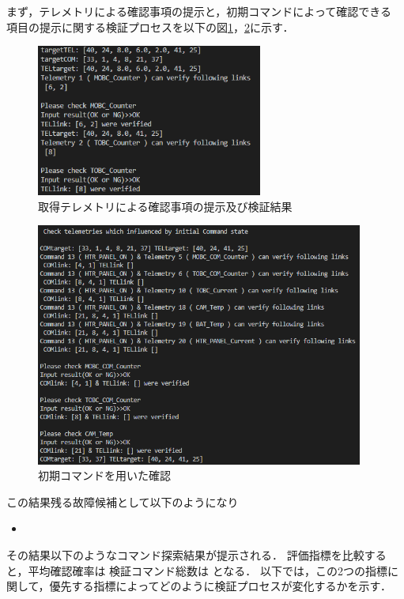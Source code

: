 \documentclass[11pt]{jsreport}
\begin{document}
まず，テレメトリによる確認事項の提示と，初期コマンドによって確認できる
項目の提示に関する検証プロセスを以下の図\ref{fig:fault_mode3_TEL_list}，\ref{fig:fault_mode3_iniCOM}に示す．
\begin{figure}[H]
   \centering
      \includegraphics[height=5.0cm]{figure/COM13_TEL16_17_14start_show_TEL_list.png}
      \caption{取得テレメトリによる確認事項の提示及び検証結果}
      \label{fig:fault_mode3_TEL_list}
\end{figure}
\begin{figure}[H]
   \centering
      \includegraphics[height=8.0cm]{figure/COM13_TEL16_17_14start_initial_COM.png}
      \caption{初期コマンドを用いた確認}
      \label{fig:fault_mode3_iniCOM}
\end{figure}


この結果残る故障候補として以下のようになり
\begin{itemize}
   \item 
\end{itemize}
その結果以下のようなコマンド探索結果が提示される．
評価指標を比較すると，平均確認確率は
検証コマンド総数は
となる．
以下では，この2つの指標に関して，優先する指標によってどのように検証プロセスが変化するかを示す．\\
\end{document}
